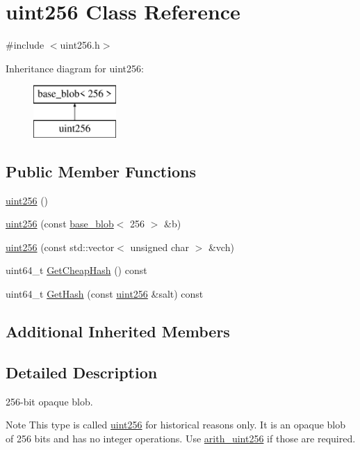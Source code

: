 \hypertarget{classuint256}{}\section{uint256 Class Reference}
\label{classuint256}


{\ttfamily \#include $<$uint256.\+h$>$}

Inheritance diagram for uint256\+:\begin{figure}[H]
\begin{center}
\leavevmode
\includegraphics[height=2.000000cm]{classuint256}
\end{center}
\end{figure}
\subsection*{Public Member Functions}
\begin{DoxyCompactItemize}
\item 
\mbox{\hyperlink{classuint256_aca0c2c2c61e453717e72a4eaec71168f}{uint256}} ()
\item 
\mbox{\hyperlink{classuint256_a01460091171cf2b82b9e41cdb0326bed}{uint256}} (const \mbox{\hyperlink{classbase__blob}{base\+\_\+blob}}$<$ 256 $>$ \&b)
\item 
\mbox{\hyperlink{classuint256_a7cad0fc486ebc2ed02462d5a7d4e4f2d}{uint256}} (const std\+::vector$<$ unsigned char $>$ \&vch)
\item 
uint64\+\_\+t \mbox{\hyperlink{classuint256_a9baaa679dcc862e37e8b6c63a15c8c11}{Get\+Cheap\+Hash}} () const
\item 
uint64\+\_\+t \mbox{\hyperlink{classuint256_a6dfa79998c7cb7def7a6c7c0a6915c58}{Get\+Hash}} (const \mbox{\hyperlink{classuint256}{uint256}} \&salt) const
\end{DoxyCompactItemize}
\subsection*{Additional Inherited Members}


\subsection{Detailed Description}
256-\/bit opaque blob. \begin{DoxyNote}{Note}
This type is called \mbox{\hyperlink{classuint256}{uint256}} for historical reasons only. It is an opaque blob of 256 bits and has no integer operations. Use \mbox{\hyperlink{classarith__uint256}{arith\+\_\+uint256}} if those are required. 
\end{DoxyNote}


